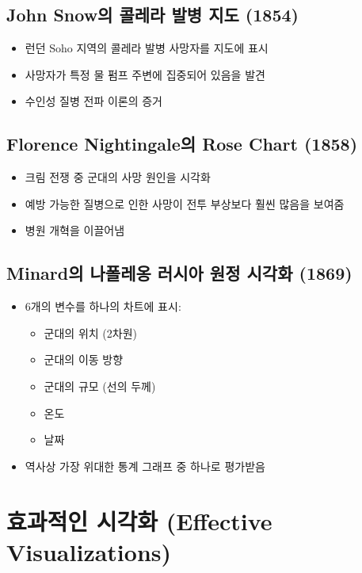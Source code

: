 \documentclass[12pt,a4paper]{article}
\begin{document}
\subsection{John Snow의 콜레라 발병 지도 (1854)}

\begin{itemize}
    \item 런던 Soho 지역의 콜레라 발병 사망자를 지도에 표시
    \item 사망자가 특정 물 펌프 주변에 집중되어 있음을 발견
    \item 수인성 질병 전파 이론의 증거
\end{itemize}

\subsection{Florence Nightingale의 Rose Chart (1858)}

\begin{itemize}
    \item 크림 전쟁 중 군대의 사망 원인을 시각화
    \item 예방 가능한 질병으로 인한 사망이 전투 부상보다 훨씬 많음을 보여줌
    \item 병원 개혁을 이끌어냄
\end{itemize}

\subsection{Minard의 나폴레옹 러시아 원정 시각화 (1869)}

\begin{itemize}
    \item 6개의 변수를 하나의 차트에 표시:
    \begin{itemize}
        \item 군대의 위치 (2차원)
        \item 군대의 이동 방향
        \item 군대의 규모 (선의 두께)
        \item 온도
        \item 날짜
    \end{itemize}
    \item 역사상 가장 위대한 통계 그래프 중 하나로 평가받음
\end{itemize}

\section{효과적인 시각화 (Effective Visualizations)}
\end{document}
